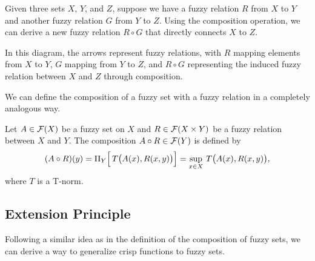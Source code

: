 

Given three sets \(X\), \(Y\), and \(Z\), suppose we have a fuzzy relation \(R\) from \(X\) to \(Y\) and another fuzzy relation \(G\) from \(Y\) to \(Z\). Using the composition operation, we can derive a new fuzzy relation \(R \circ G\) that directly connects \(X\) to \(Z\).

\noindent
\begin{minipage}{0.7\textwidth}
In this diagram, the arrows represent fuzzy relations, with \(R\) mapping elements from \(X\) to \(Y\), \(G\) mapping from \(Y\) to \(Z\), and \(R \circ G\) representing the induced fuzzy relation between \(X\) and \(Z\) through composition.\\
\end{minipage}%
\begin{minipage}{0.3\textwidth}
  \begin{center}
  \end{center}

\end{minipage}


We can define the composition of a fuzzy set with a fuzzy relation in a completely analogous way. 

\begin{definition}
    Let \( A \in \mathcal{F}(X) \) be a fuzzy set on \(X\) and \( R \in \mathcal{F}(X \times Y) \) be a fuzzy relation between \(X\) and \(Y\). The composition \( A \circ R \in \mathcal{F}(Y) \) is defined by
    \[
    (A \circ R)(y) = \Pi_{Y}\Bigl[\, T\bigl( A(x), R(x,y) \bigr) \Bigr] = \sup_{x \in X}\, T\bigl( A(x), R(x,y) \bigr),
    \]
    where \(T\) is a T-norm.
\end{definition}

\subsection{Extension Principle}
\label{sec:ext_pple}

Following a similar idea as in the definition of the composition of fuzzy sets, we can derive a way to generalize crisp functions to fuzzy sets.\\

